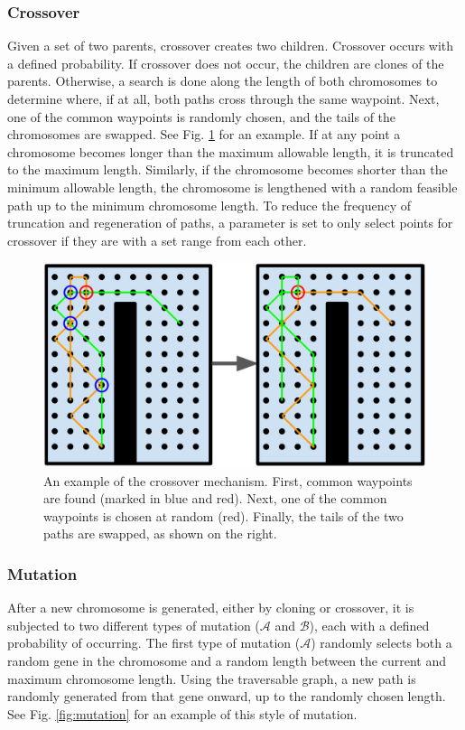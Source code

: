 \documentclass[letterpaper, 10 pt, conference]{ieeeconf}  %
\begin{document}
\subsubsection{Crossover}

Given a set of two parents, crossover creates two children. Crossover occurs with a defined probability. If crossover does not occur, the children are clones of the parents. Otherwise, a search is done along the length of both chromosomes to determine where, if at all, both paths cross through the same waypoint. Next, one of the common waypoints is randomly chosen, and the tails of the chromosomes are swapped. See Fig. \ref{fig:crossover} for an example. If at any point a chromosome becomes longer than the maximum allowable length, it is truncated to the maximum length. Similarly, if the chromosome becomes shorter than the minimum allowable length, the chromosome is lengthened with a random feasible path up to the minimum chromosome length. To reduce the frequency of truncation and regeneration of paths, a parameter is set to only select points for crossover if they are with a set range from each other.

\begin{figure}
\centering
\includegraphics[width=0.8\linewidth]{figures/crossover.png}
\caption{An example of the crossover mechanism. First, common waypoints are found (marked in blue and red). Next, one of the common waypoints is chosen at random (red). Finally, the tails of the two paths are swapped, as shown on the right.}
\label{fig:crossover}
\end{figure}

\subsubsection{Mutation}

After a new chromosome is generated, either by cloning or crossover, it is subjected to two different types of mutation ($\mathcal{A}$ and $\mathcal{B}$), each with a defined probability of occurring. The first type of mutation ($\mathcal{A}$) randomly selects both a random gene in the chromosome and a random length between the current and maximum chromosome length. Using the traversable graph, a new path is randomly generated from that gene onward, up to the randomly chosen length. See Fig. \ref{fig:mutation} for an example of this style of mutation.
\end{document}
